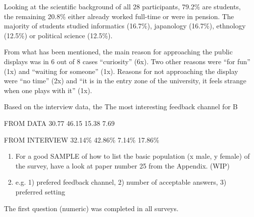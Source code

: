 Looking at the scientific background of all 28 participants, 79.2\% are students, the remaining 20.8\% either already worked full-time or were in pension. The majority of students studied informatics (16.7\%), japanology (16.7\%), ethnology (12.5\%) or political science (12.5\%).

From what has been mentioned, the main reason for approaching the public displays was in 6 out of 8 cases ``curiosity'' (6x). Two other reasons were ``for fun'' (1x) and ``waiting for someone'' (1x). Reasons for not approaching the display were ``no time'' (2x) and ``it is in the entry zone of the university, it feels strange when one plays with it'' (1x).

Based on the interview data, the 
The most interesting feedback channel for 
B 


FROM DATA
30.77%
46.15%
15.38%
7.69%

FROM INTERVIEW
32.14\%
42.86\%
7.14\%
17.86\%



	



	\begin{enumerate}
	\item For a good SAMPLE of how to list the basic population (x male, y female) of the survey, have a look at paper number 25 from the Appendix. (WIP)


	\item e.g. 1) prefered feedback channel, 2) number of acceptable answers, 3) preferred setting
	\end{enumerate}
	


	The first question (numeric) was completed in all surveys. 








